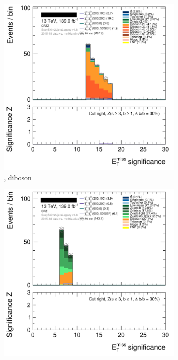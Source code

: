 \begin{figure}[tp]
\centering
\begin{subfigure}{0.48\textwidth}
\centering
\includegraphics[width=\textwidth]{figures/2ljets_splits_met_Sign_CRZZ.png}
\caption{\crvz, diboson}
\label{fig:2ljets_splits_diboson}
\end{subfigure}
\hfill
\begin{subfigure}{0.48\textwidth}
\centering
\includegraphics[width=\textwidth]{figures/2ljets_splits_met_Sign_CRZ.png}

\end{subfigure}
\end{figure}
